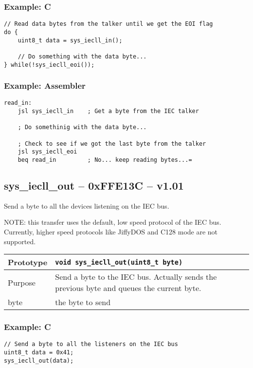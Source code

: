 \subsubsection*{Example: C}
\begin{lstlisting}
// Read data bytes from the talker until we get the EOI flag
do {
    uint8_t data = sys_iecll_in();

    // Do something with the data byte...
} while(!sys_iecll_eoi());
\end{lstlisting}

\subsubsection*{Example: Assembler}
\begin{verbatim}
read_in:
    jsl sys_iecll_in    ; Get a byte from the IEC talker

    ; Do somethinig with the data byte...

    ; Check to see if we got the last byte from the talker
    jsl sys_iecll_eoi
    beq read_in         ; No... keep reading bytes...=
\end{verbatim}


\subsection*{sys\_iecll\_out -- 0xFFE13C -- v1.01}
Send a byte to all the devices listening on the IEC bus.

NOTE: this transfer uses the default, low speed protocol of the IEC bus.
Currently, higher speed protocols like JiffyDOS and C128 mode are not supported.

\bigskip

\begin{table}[!h]\begin{tabular}{|l||l|} \hline
Prototype & \lstinline!void sys_iecll_out(uint8_t byte)! \\ \hline
Purpose & Send a byte to the IEC bus. Actually sends the previous byte and queues the current byte. \\ \hline
byte & the byte to send \\ \hline
\end{tabular}\end{table}

\subsubsection*{Example: C}
\begin{lstlisting}
// Send a byte to all the listeners on the IEC bus
uint8_t data = 0x41;
sys_iecll_out(data);
\end{lstlisting}


